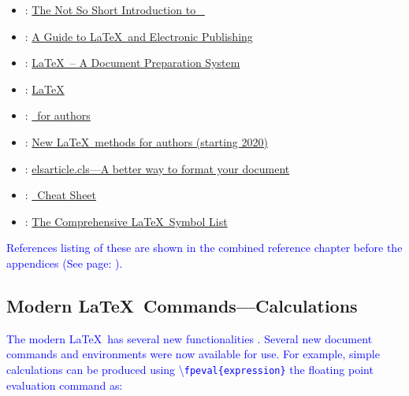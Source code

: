 \documentclass[phd]{ndsu-thesis-2022}
\newcommand\italk[1]{\textcolor{blue}{#1}}  %
\newcommand\cmd[1]{\textbackslash\texttt{#1}}  %
\begin{document}
\begin{itemize}
\setlength\itemindent{0.25in}
\item \citet{notso2021}:  \textcolor{magenta}{\href{http://tug.ctan.org/info/lshort/english/lshort.pdf}
{The Not So Short Introduction to \LaTeXe\ }}

\item \citet{kopka2004guide}:  \textcolor{magenta}{\href{https://www.math.ucdavis.edu/~tracy/courses/math129/Guide_To_LaTeX.pdf}
{A Guide to \LaTeX\ and Electronic Publishing}}

\item \citet{lamport94}: \textcolor{magenta}{\href{https://www.pearson.com/us/higher-education/program/Lamport-La-Te-X-A-Document-Preparation-System-2nd-Edition/PGM159713.html}
{\LaTeX\ -- A Document Preparation System}}

\item \citet{Wikibook2016}: \textcolor{magenta}{\href{http://upload.wikimedia.org/wikipedia/commons/2/2d/LaTeX.pdf}
{LaTeX}}

\item \citet{latxprojteam20}: \textcolor{magenta}{\href{https://www.latex-project.org/help/documentation/usrguide.pdf}
{\LaTeXe\ for authors}}

\item \citet{latxprojteam22}: \textcolor{magenta}{\href{https://www.latex-project.org/help/documentation/usrguide3.pdf}
{New \LaTeX\ methods for authors (starting 2020)}}

\item \citet{elsevier2020}: \textcolor{magenta}{\href{https://www.elsevier.com/authors/policies-and-guidelines/documents/elsdoc-1.pdf}
{elsarticle.cls---A better way to format your document}}

\item \citet{Chang2014cheat}: \textcolor{magenta}{\href{https://wch.github.io/latexsheet/latexsheet.pdf}
{\LaTeXe\ Cheat Sheet}}

\item \citet{pakin2021comp}: \textcolor{magenta}{\href{https://tug.ctan.org/info/symbols/comprehensive/symbols-a4.pdf}
{The Comprehensive \LaTeX\ Symbol List}}
\end{itemize}

\italk{References listing of these are shown in the combined reference chapter before the appendices (See page: \pageref{biblio}).}

\subsection{Modern \LaTeX\ Commands---Calculations}
\italk{The modern \LaTeX\ has several new functionalities \citep{latxprojteam22}. Several new document commands and environments were now available for use.  For example, simple calculations can be produced using \cmd{fpeval\{expression\}} the floating point evaluation command as:}
\end{document}
